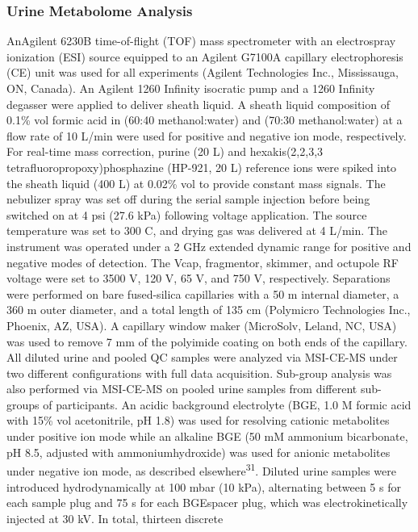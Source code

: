 \documentclass[journal=jacsat,manuscript=article]{achemso}
\begin{document}
\subsubsection{Urine Metabolome
Analysis}\label{urine-metabolome-analysis}

AnAgilent 6230B time-of-flight (TOF) mass spectrometer with an
electrospray ionization (ESI) source equipped to an Agilent G7100A
capillary electrophoresis (CE) unit was used for all experiments
(Agilent Technologies Inc., Mississauga, ON, Canada). An Agilent 1260
Infinity isocratic pump and a 1260 Infinity degasser were applied to
deliver sheath liquid. A sheath liquid composition of 0.1\% vol formic
acid in (60:40 methanol:water) and (70:30 methanol:water) at a flow rate
of 10 L/min were used for positive and negative ion mode, respectively.
For real-time mass correction, purine (20 L) and hexakis(2,2,3,3
tetrafluoropropoxy)phosphazine (HP-921, 20 L) reference ions were spiked
into the sheath liquid (400 L) at 0.02\% vol to provide constant mass
signals. The nebulizer spray was set off during the serial sample
injection before being switched on at 4 psi (27.6 kPa) following voltage
application. The source temperature was set to 300 C, and drying gas was
delivered at 4 L/min. The instrument was operated under a 2 GHz extended
dynamic range for positive and negative modes of detection. The Vcap,
fragmentor, skimmer, and octupole RF voltage were set to 3500 V, 120 V,
65 V, and 750 V, respectively. Separations were performed on bare
fused-silica capillaries with a 50 m internal diameter, a 360 m outer
diameter, and a total length of 135 cm (Polymicro Technologies Inc.,
Phoenix, AZ, USA). A capillary window maker (MicroSolv, Leland, NC, USA)
was used to remove 7 mm of the polyimide coating on both ends of the
capillary. All diluted urine and pooled QC samples were analyzed via
MSI-CE-MS under two different configurations with full data acquisition.
Sub-group analysis was also performed via MSI-CE-MS on pooled urine
samples from different sub-groups of participants. An acidic background
electrolyte (BGE, 1.0 M formic acid with 15\% vol acetonitrile, pH 1.8)
was used for resolving cationic metabolites under positive ion mode
while an alkaline BGE (50 mM ammonium bicarbonate, pH 8.5, adjusted with
ammoniumhydroxide) was used for anionic metabolites under negative ion
mode, as described elsewhere\textsuperscript{31}. Diluted urine samples
were introduced hydrodynamically at 100 mbar (10 kPa), alternating
between 5 s for each sample plug and 75 s for each BGEspacer plug, which
was electrokinetically injected at 30 kV. In total, thirteen discrete
\end{document}

